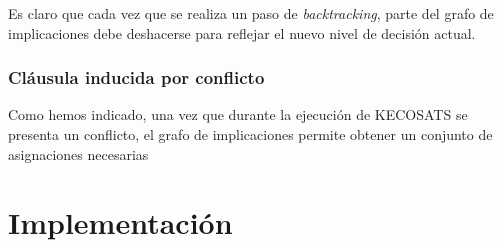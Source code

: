\documentclass[12pt,lettersize,oneside]{article}
\begin{document}
Es claro que cada vez que se realiza un paso de \emph{backtracking}, parte del
grafo de implicaciones debe deshacerse para reflejar el nuevo nivel de decisión
actual.
\subsubsection{Cláusula inducida por conflicto}

Como hemos indicado, una vez que durante la ejecución de KECOSATS se presenta un
conflicto, el grafo de implicaciones permite obtener un conjunto de asignaciones
necesarias 


\section{Implementación}
\end{document}
